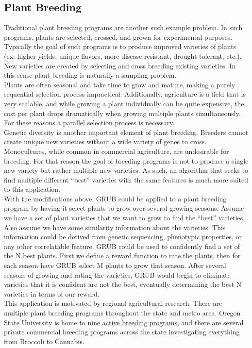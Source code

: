 \documentclass{article}[12pt]
\begin{document}
\subsection{Plant Breeding}

Traditional plant breeding programs are another such example problem.
In such programs, plants are selected, crossed, and grown for experimental purposes.
Typically the goal of such programs is to produce improved varieties of plants (ex: higher yields, unique flavors, more disease resistant, drought tolerant, etc.).
New varieties are created by selecting and cross breeding existing varieties. In this sense plant breeding is naturally a sampling problem. \\

Plants are often seasonal and take time to grow and mature, making a purely sequential selection process impractical.
Additionally, agriculture is a field that is very scalable, and while growing a plant individually can be quite expensive,
the cost per plant drops dramatically when growing multiple plants simultaneously.
For these reasons a parallel selection process is necessary. \\

Genetic diversity is another important element of plant breeding.
Breeders cannot create unique new varieties without a wide variety of genes to cross.
Monocultures, while common in commercial agriculture, are undesirable for breeding.
For that reason the goal of breeding programs is not to produce a single new variety but rather multiple new varieties.
As such, an algorithm that seeks to find multiple different ``best'' varieties with the same features is much more suited to this application. \\

With the modifications above, GRUB could be applied to a plant breeding program by having it select plants to grow over several growing seasons.
Assume we have a set of plant varieties that we want to grow to find the ``best'' varieties.
Also assume we have some similarity information about the varieties.
This information could be derived from genetic sequencing, phenotypic properties, or any other correlatable feature.
GRUB could be used to confidently find a set of the N best plants.
First we define a reward function to rate the plants, then for each season have GRUB select M plants to grow that season.
After several seasons of growing and rating the varieties, GRUB would begin to eliminate varieties that it is confident are not the best,
eventually determining the best N varieties in terms of our reward. \\

This application is motivated by regional agricultural research.
There are multiple plant breeding programs throughout the state and metro area.
Oregon State University is home to \href{https://plantbreeding.oregonstate.edu/}{nine active breeding programs},
and there are several private commercial breeding programs across the state investigating everything from Broccoli to Cannabis.
\end{document}
